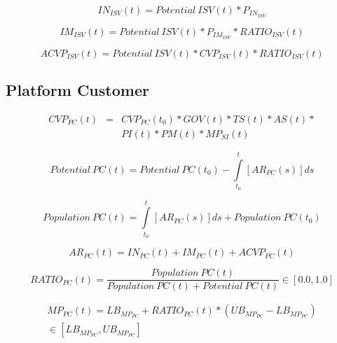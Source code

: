 \begin{equation}
		IN_{ISV}(t) = \mathit{Potential~ISV(t)} * P_{IN_{ISV}}
\end{equation}

\begin{equation}
		IM_{ISV}(t) = \mathit{Potential~ISV(t)} * P_{IM_{ISV}} * RATIO_{ISV}(t)
\end{equation}

\begin{equation}
		ACVP_{ISV}(t) = \mathit{Potential~ISV(t)} * CVP_{ISV}(t) * RATIO_{ISV}(t)
\end{equation}

\subsection{Platform Customer}\label{ch:app04:csf:pc}

\begin{eqnarray}
		CVP_ {PC}(t) & = & CVP_{PC}(t_0) * GOV(t) * TS(t) * AS(t) * \nonumber \\ & & PI(t) * PM(t) * MP_{SI}(t)
\end{eqnarray}

\begin{equation}
	\mathit{Potential~PC(t)} =\mathit{Potential~PC(t_0)} - \int\limits_{t_0}^t  [AR_{PC}(s)]ds
\end{equation}

\begin{equation}
	\mathit{Population~PC(t)} = \int\limits_{t_0}^t [AR_{PC}(s)]ds + \mathit{Population~PC(t_0)}
\end{equation}

\begin{equation}
		AR_{PC}(t) = IN_{PC}(t) + IM_{PC}(t) + ACVP_{PC}(t)	
\end{equation}

\begin{equation}
		RATIO_{PC}(t) = \frac{\mathit{Population~PC(t)}}{\mathit{Population~PC(t)} + \mathit{Potential~PC(t)}} \in [0.0,1.0]
\end{equation}

\begin{eqnarray}
	MP_{PC}(t) = LB_{MP_{PC}} + RATIO_{PC}(t) * (UB_{MP_{PC}} - LB_{MP_{PC}})  \nonumber \\ \in [LB_{MP_{PC}},UB_{MP_{PC}}]
\end{eqnarray}

